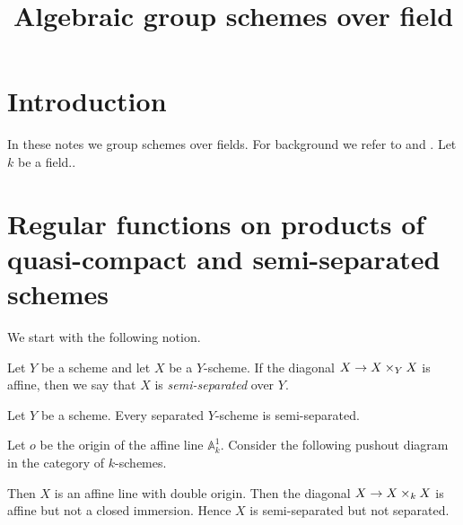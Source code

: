 



\title{Algebraic group schemes over field}
\date{}
\maketitle

\section{Introduction}
\noindent
In these notes we group schemes over fields. For background we refer to \cite{kfunctors} and \cite{Monoid_k_functors}. Let $k$ be a field..

\section{Regular functions on products of quasi-compact and semi-separated schemes}
\noindent
We start with the following notion.

\begin{definition}
Let $Y$ be a scheme and let $X$ be a $Y$-scheme. If the diagonal $X\rightarrow X\times_Y X$ is affine, then we say that $X$ is \textit{semi-separated} over $Y$.
\end{definition}

\begin{remark}\label{remark:separated_is_semi-separated}
Let $Y$ be a scheme. Every separated $Y$-scheme is semi-separated.
\end{remark}

\begin{example}
Let $o$ be the origin of the affine line $\mathbb{A}^1_k$. Consider the following pushout diagram in the category of $k$-schemes.
\begin{center}
\end{center}
Then $X$ is an affine line with double origin. Then the diagonal $X\rightarrow X\times_k X$ is affine but not a closed immersion. Hence $X$ is semi-separated but not separated.
\end{example}

